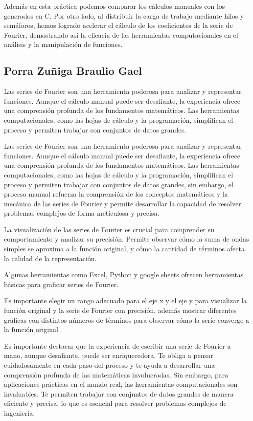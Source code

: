 Además en esta práctica podemos comparar los cálculos manuales con los generados en C. Por otro lado, al distribuir la carga de trabajo mediante hilos y semáforos, hemos logrado acelerar el cálculo de los coeficientes de la serie de Fourier, demostrando así la eficacia de las herramientas computacionales en el análisis y la manipulación de funciones.

\subsection{Porra Zuñiga Braulio Gael}

Las series de Fourier son una herramienta poderosa para analizar y representar funciones. Aunque el cálculo manual puede ser desafiante, la experiencia ofrece una comprensión profunda de los fundamentos matemáticos. Las herramientas computacionales, como las hojas de cálculo y la programación, simplifican el proceso y permiten trabajar con conjuntos de datos grandes.

Las series de Fourier son una herramienta poderosa para analizar y representar funciones. Aunque el cálculo manual puede ser desafiante, la experiencia ofrece una comprensión profunda de los fundamentos matemáticos. Las herramientas computacionales, como las hojas de cálculo y la programación, simplifican el proceso y permiten trabajar con conjuntos de datos grandes, sin embargo, el proceso manual refuerza la comprensión de los conceptos matemáticos y la mecánica de las series de Fourier y permite desarrollar la capacidad de resolver problemas complejos de forma meticulosa y precisa.

La visualización de las series de Fourier es crucial para comprender su comportamiento y analizar su precisión. Permite observar cómo la suma de ondas simples se aproxima a la función original, y cómo la cantidad de términos afecta la calidad de la representación.

Algunas herramientas como Excel, Python y google sheets ofrecen herramientas básicas para graficar series de Fourier.

Es importante elegir un rango adecuado para el eje x y el eje y para visualizar la función original y la serie de Fourier con precisión, además mostrar diferentes gráficas con distintos números de términos para observar cómo la serie converge a la función original

Es importante destacar que la experiencia de escribir una serie de Fourier a mano, aunque desafiante, puede ser enriquecedora. Te obliga a pensar cuidadosamente en cada paso del proceso y te ayuda a desarrollar una comprensión profunda de las matemáticas involucradas. Sin embargo, para aplicaciones prácticas en el mundo real, las herramientas computacionales son invaluables. Te permiten trabajar con conjuntos de datos grandes de manera eficiente y precisa, lo que es esencial para resolver problemas complejos de ingeniería.


